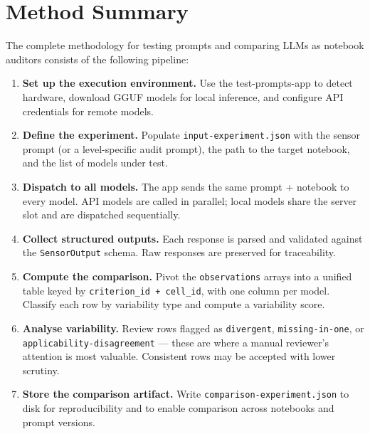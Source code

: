 \documentclass[11pt, a4paper]{article}
\begin{document}
\section{Method Summary}

The complete methodology for testing prompts and comparing LLMs as notebook
auditors consists of the following pipeline:

\begin{enumerate}[leftmargin=*]
  \item \textbf{Set up the execution environment.} Use the test-prompts-app
        to detect hardware, download GGUF models for local inference, and
        configure API credentials for remote models.

  \item \textbf{Define the experiment.} Populate
        \texttt{input-experiment.json} with the sensor prompt (or a
        level-specific audit prompt), the path to the target notebook,
        and the list of models under test.

  \item \textbf{Dispatch to all models.} The app sends the same prompt +
        notebook to every model. API models are called in parallel; local
        models share the server slot and are dispatched sequentially.

  \item \textbf{Collect structured outputs.} Each response is parsed and
        validated against the \texttt{SensorOutput} schema. Raw responses
        are preserved for traceability.

  \item \textbf{Compute the comparison.} Pivot the \texttt{observations}
        arrays into a unified table keyed by \texttt{criterion\_id +
        cell\_id}, with one column per model. Classify each row by
        variability type and compute a variability score.

  \item \textbf{Analyse variability.} Review rows flagged as
        \texttt{divergent}, \texttt{missing-in-one}, or
        \texttt{applicability-disagreement} — these are where a manual
        reviewer's attention is most valuable. Consistent rows may be
        accepted with lower scrutiny.

  \item \textbf{Store the comparison artifact.} Write
        \texttt{comparison-experiment.json} to disk for reproducibility
        and to enable comparison across notebooks and prompt versions.
\end{enumerate}
\end{document}
